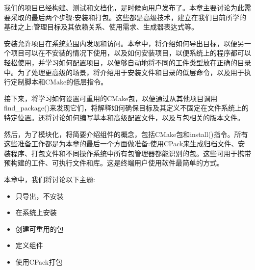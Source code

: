 
我们的项目已经构建、测试和文档化，是时候向用户发布了。本章主要讨论为此需要采取的最后两个步骤:安装和打包。这些都是高级技术，建立在我们目前所学的基础之上:管理目标及其依赖关系、使用需求、生成器表达式等。

安装允许项目在系统范围内发现和访问。本章中，将介绍如何导出目标，以便另一个项目可以在不安装的情况下使用，以及如何安装项目，以便系统上的程序都可以轻松使用，并学习如何配置项目，以便够自动地将不同的工件类型放在正确的目录中。为了处理更高级的场景，将介绍用于安装文件和目录的低层命令，以及用于执行定制脚本和CMake的低层指令。

接下来，将学习如何设置可重用的CMake包，以便通过从其他项目调用find\_package()来发现它们，将解释如何确保目标及其定义不固定在文件系统上的特定位置。还将讨论如何编写基本和高级配置文件，以及与包相关的版本文件。

然后，为了模块化，将简要介绍组件的概念，包括CMake包和install()指令。所有这些准备工作都是为本章的最后一个方面做准备:使用CPack来生成归档文件、安装程序、打包文件和不同操作系统中所有包管理器都能识别的包。这些可用于携带预构建的工件、可执行文件和库。这是终端用户使用软件最简单的方式。

本章中，我们将讨论以下主题:

\begin{itemize}
\item 
只导出，不安装

\item 
在系统上安装

\item 
创建可重用的包

\item 
定义组件

\item 
使用CPack打包
\end{itemize}









